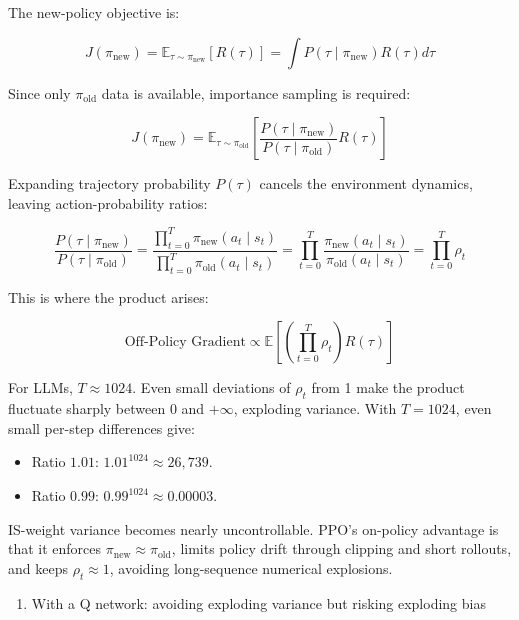 The new-policy objective is:

\[
J(\pi_{\mathrm{new}})
=
\mathbb{E}_{\tau\sim\pi_{\mathrm{new}}}[R(\tau)]
=
\int P(\tau\mid\pi_{\mathrm{new}})R(\tau)d\tau
\]

Since only \(\pi_{\mathrm{old}}\) data is available, importance sampling is required:

\[
J(\pi_{\mathrm{new}})
=
\mathbb{E}_{\tau\sim\pi_{\mathrm{old}}}
\left[
\frac{P(\tau\mid\pi_{\mathrm{new}})}
{P(\tau\mid\pi_{\mathrm{old}})}
R(\tau)
\right]
\]

Expanding trajectory probability \(P(\tau)\) cancels the environment dynamics, leaving action-probability ratios:

\[
\frac{P(\tau\mid\pi_{\mathrm{new}})}
{P(\tau\mid\pi_{\mathrm{old}})}
=
\frac{\prod_{t=0}^{T}\pi_{\mathrm{new}}(a_t\mid s_t)}
{\prod_{t=0}^{T}\pi_{\mathrm{old}}(a_t\mid s_t)}
=
\prod_{t=0}^{T}
\frac{\pi_{\mathrm{new}}(a_t\mid s_t)}
{\pi_{\mathrm{old}}(a_t\mid s_t)}
=
\prod_{t=0}^{T}\rho_t
\]

This is where the product arises:

\[
\text{Off-Policy Gradient}
\propto
\mathbb{E}
\left[
\left(\prod_{t=0}^{T}\rho_t\right)R(\tau)
\right]
\]

For LLMs, \(T\approx1024\). Even small deviations of \(\rho_t\) from 1 make the product fluctuate sharply between 0 and \(+\infty\), exploding variance. With \(T=1024\), even small per-step differences give:

\begin{itemize}
\tightlist
\item
  Ratio \(1.01\): \(1.01^{1024}\approx 26,739\).
\item
  Ratio \(0.99\): \(0.99^{1024}\approx 0.00003\).
\end{itemize}

IS-weight variance becomes nearly uncontrollable. PPO's on-policy advantage is that it enforces \(\pi_{\mathrm{new}}\approx\pi_{\mathrm{old}}\), limits policy drift through clipping and short rollouts, and keeps \(\rho_t\approx1\), avoiding long-sequence numerical explosions.

\begin{enumerate}
\def\labelenumi{(\arabic{enumi})}
\setcounter{enumi}{1}
\tightlist
\item
  With a Q network: avoiding exploding variance but risking exploding bias
\end{enumerate}

